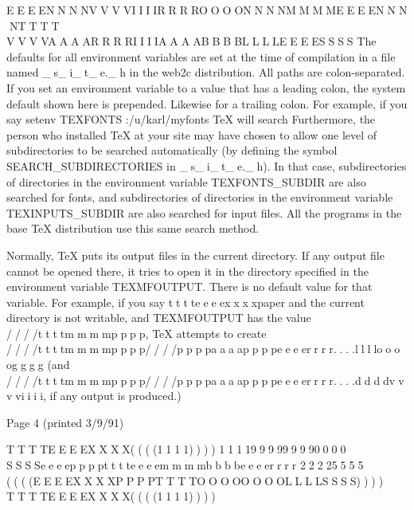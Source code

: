      EEEENNNNVVVVIIIIRRRROOOONNNNMMMMEEEENNNNTTTT VVVVAAAARRRRIIIIAAAABBBBLLLLEEEESSSS
          The defaults for all environment variables are set at the
          time of compilation in a file named _s_i_t_e._h in the web2c
          distribution.  All paths are colon-separated. If you set an
          environment variable to a value that has a leading colon,
          the system default shown here is prepended.  Likewise for a
          trailing colon.  For example, if you say
              setenv TEXFONTS :/u/karl/myfonts
          TeX will search
              Furthermore, the person who installed TeX at your site
          may have chosen to allow one level of subdirectories to be
          searched automatically (by defining the symbol
          SEARCH_SUBDIRECTORIES in _s_i_t_e._h).  In that case,
          subdirectories of directories in the environment variable
          TEXFONTS_SUBDIR are also searched for fonts, and
          subdirectories of directories in the environment variable
          TEXINPUTS_SUBDIR are also searched for input files.  All the
          programs in the base TeX distribution use this same search
          method.

          Normally, TeX puts its output files in the current
          directory.  If any output file cannot be opened there, it
          tries to open it in the directory specified in the
          environment variable TEXMFOUTPUT. There is no default value
          for that variable.  For example, if you say tttteeeexxxxpaper and the
          current directory is not writable, and TEXMFOUTPUT has the
          value ////ttttmmmmpppp, TeX attempts to create ////ttttmmmmpppp////ppppaaaappppeeeerrrr....lllloooogggg (and
          ////ttttmmmmpppp////ppppaaaappppeeeerrrr....ddddvvvviiii, if any output is produced.)




     Page 4                                           (printed 3/9/91)






     TTTTEEEEXXXX((((1111))))            1111999999990000 SSSSeeeepppptttteeeemmmmbbbbeeeerrrr 22225555 ((((EEEEXXXXPPPPTTTTOOOOOOOOLLLLSSSS))))             TTTTEEEEXXXX((((1111))))




